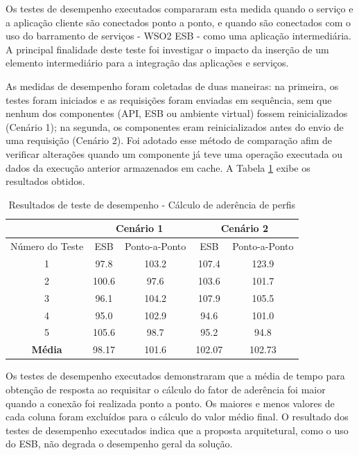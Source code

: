 Os testes de desempenho executados compararam esta medida quando o serviço e a aplicação cliente são conectados ponto a ponto, e quando são conectados com o uso do barramento de serviços - WSO2 ESB - como uma aplicação intermediária. A principal finalidade deste teste foi investigar o impacto da inserção de um elemento intermediário para a integração das aplicações e serviços.

As medidas de desempenho foram coletadas de duas maneiras: na primeira, os testes foram iniciados e as requisições foram enviadas em sequência, sem que nenhum dos componentes (API, ESB ou ambiente virtual) fossem reinicializados (Cenário 1); na segunda, os componentes eram reinicializados antes do envio de uma requisição (Cenário 2). Foi adotado esse método de comparação afim de verificar alterações quando um componente já teve uma operação executada ou dados da execução anterior armazenados em cache. A Tabela \ref{resultado_desempenho} exibe os resultados obtidos.

\begin{table}[!htbp]
\centering
\caption{Resultados de teste de desempenho - Cálculo de aderência de perfis}
\label{resultado_desempenho}
\begin{tabular}{*5c}
\toprule
  & \multicolumn{2}{c}{Cenário 1} & \multicolumn{2}{c}{Cenário 2} \\ 
\midrule
Número do Teste               & ESB   & Ponto-a-Ponto & ESB    & Ponto-a-Ponto \\
1                            & 97.8  &    103.2      & 107.4  &  123.9   \\
2                            & 100.6 &     97.6      & 103.6  &  101.7   \\
3                            & 96.1  &    104.2      & 107.9  &  105.5   \\ 
4                            & 95.0  &    102.9      &  94.6  &  101.0   \\ 
5                            & 105.6 &     98.7      &  95.2  &   94.8   \\ 
\midrule
\textbf{Média}               & 98.17 &    101.6      & 102.07 &  102.73   \\ 
\bottomrule
\end{tabular}
\end{table}

Os testes de desempenho executados demonstraram que a média de tempo para obtenção de resposta ao requisitar o cálculo do fator de aderência foi maior quando a conexão foi realizada ponto a ponto. Os maiores e menos valores de cada coluna foram excluídos para o cálculo do valor médio final. O resultado dos testes de desempenho executados indica que a proposta arquitetural, como o uso do ESB, não degrada o desempenho geral da solução.

